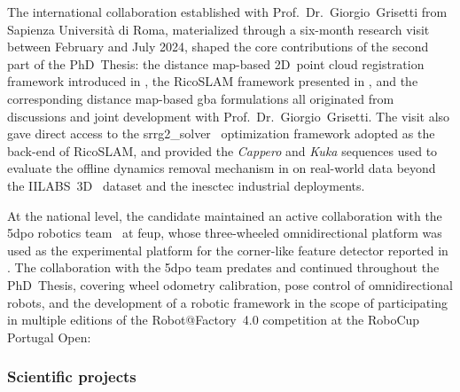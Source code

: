 The international collaboration established with Prof.~Dr.~Giorgio~Grisetti from
Sapienza Università di Roma, materialized through a six-month research
visit between February and July 2024, shaped the
core contributions of the second part of the PhD~Thesis:
the distance map-based 2D~point cloud registration
framework introduced in , the RicoSLAM
framework presented in , and the corresponding
distance map-based \gls{gba} formulations all originated from
discussions and joint development with Prof.~Dr.~Giorgio~Grisetti.
The visit also gave direct access to the srrg2\_solver~\cite{grisetti:robotics:2020}
optimization framework adopted as the back-end of RicoSLAM, and
provided the \emph{Cappero} and \emph{Kuka} sequences used to evaluate
the offline dynamics removal mechanism in
 on real-world data beyond the
IILABS~3D~\cite{ribeiro:access:2025} dataset and the
\gls{inesctec} industrial deployments.

At the national level, the candidate maintained an active collaboration
with the 5dpo robotics team~\cite{5dpo} at \gls{feup}, whose
three-wheeled omnidirectional platform was used as the experimental
platform for the corner-like feature detector reported in
. The collaboration with the 5dpo team
predates and continued throughout the PhD~Thesis, covering wheel
odometry calibration, pose control of omnidirectional robots, and
the development of a robotic framework in the scope of participating in multiple
editions of the Robot@Factory~4.0 competition at the RoboCup Portugal Open:
\begin{description}[leftmargin=1.25cm,style=nextline,font=\normalfont]
\item[\cite{sousa:icarsc:2021}] 
\item[\cite{sousa:jint:2022}]   
\item[\cite{sousa:icarsc:2024}] 
\item[\cite{lopes:icarsc:2025}] 
\end{description}

\subsubsection{Scientific projects}

